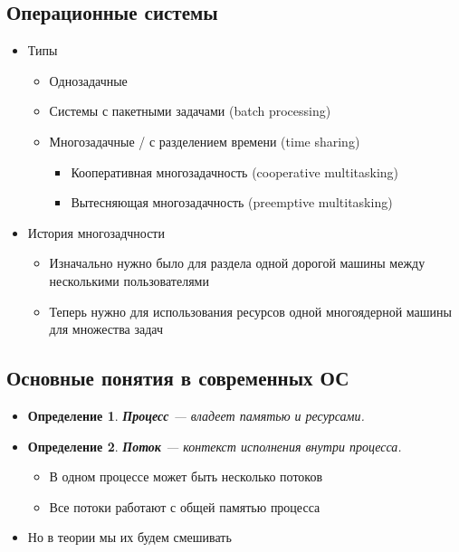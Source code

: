 \documentclass[10pt,a4paper,oneside,titlepage]{article}
\theoremstyle{plain}
\theoremstyle{defenition}
\newtheorem*{defenition}{Определение}
\begin{document}
\subsection{Операционные системы}
\begin{itemize}
	\item Типы
	\begin{itemize}
		\item Однозадачные
		\item Системы с пакетными задачами (batch processing)
		\item Многозадачные / с разделением времени (time sharing)
		\begin{itemize}
			\item Кооперативная многозадачность (cooperative multitasking)
			\item Вытесняющая многозадачность (preemptive multitasking)
		\end{itemize}
	\end{itemize}
    \item История многозадчности
    \begin{itemize}
    	\item Изначально нужно было для раздела одной дорогой машины между несколькими пользователями
    	\item Теперь нужно для использования ресурсов одной многоядерной машины для множества задач
    \end{itemize}
\end{itemize}

\subsection{Основные понятия в современных ОС}
\begin{itemize}
	\item \begin{defenition}
		{\bfseries Процесс} --- владеет памятью и ресурсами.
	\end{defenition}
	\item \begin{defenition}
		{\bfseries Поток} --- контекст исполнения внутри процесса.
	\end{defenition}
	\begin{itemize}
		\item В одном процессе может быть несколько потоков
		\item Все потоки работают с общей памятью процесса
	\end{itemize}
    \item Но в теории мы их будем смешивать
\end{itemize}
\end{document}
